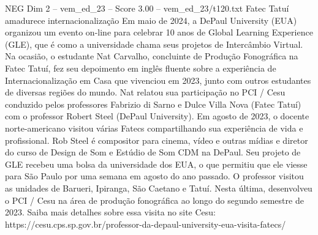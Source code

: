 \begin{textsample}{NEG Dim 2 – vem\_ed\_23 – Score 3.00 – vem\_ed\_23/t120.txt}  \label{ex:f2_neg_081}
Fatec Tatuí amadurece internacionalização Em maio de 2024, a DePaul University (EUA) organizou um evento on-line para celebrar 10 anos de Global Learning Experience (GLE), que é como a universidade chama seus projetos de Intercâmbio Virtual.
Na ocasião, o estudante Nat Carvalho, concluinte de Produção Fonográfica na Fatec Tatuí, fez seu depoimento em inglês fluente sobre a experiência de Internacionalização em Casa que vivenciou em 2023, junto com outros estudantes de diversas regiões do mundo.
Nat relatou sua participação no PCI / Cesu conduzido pelos professores Fabrizio di Sarno e Dulce Villa Nova (Fatec Tatuí) com o professor Robert Steel (DePaul University).
Em agosto de 2023, o docente norte-americano visitou várias Fatecs compartilhando sua experiência de vida e profissional.
Rob Steel é compositor para cinema, vídeo e outras mídias e diretor do curso de Design de Som e Estúdio de Som CDM na DePaul.
Seu projeto de GLE recebeu uma bolsa da universidade dos EUA, o que permitiu que ele viesse para São Paulo por uma semana em agosto do ano passado.
O professor visitou as unidades de Barueri, Ipiranga, São Caetano e Tatuí.
Nesta última, desenvolveu o PCI / Cesu na área de produção fonográfica ao longo do segundo semestre de 2023.
Saiba mais detalhes sobre essa visita no site Cesu: https://cesu.cps.sp.gov.br/professor-da-depaul-university-eua-visita-fatecs/

\end{textsample}
